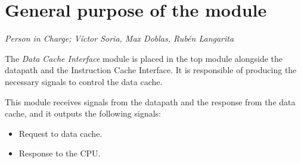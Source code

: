 \newpage
\section{General purpose of the module}
\textit{Person in Charge; V\'ictor Soria, Max Doblas, Rub\'en Langarita}

The \textit{Data Cache Interface} module is placed in the top module alongside the datapath and the Instruction Cache Interface.
It is responsible of producing the necessary signals to control the data cache.

This module receives signals from the datapath and the response from the data cache, and it outputs the following signals:

\begin{itemize}
    \item Request to data cache.
    \item Response to the CPU.
\end{itemize}
